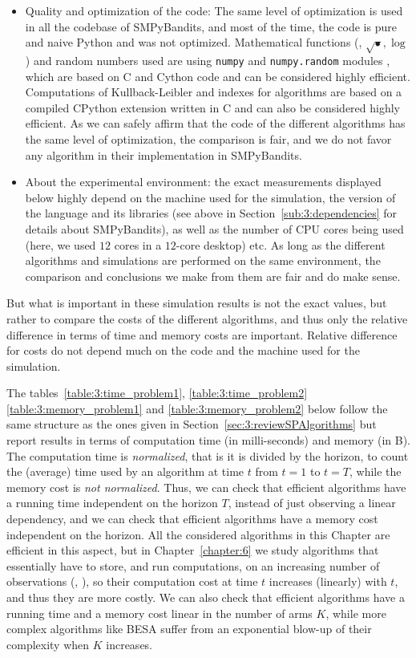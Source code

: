 \begin{itemize}
    \item Quality and optimization of the code:
    The same level of optimization is used in all the codebase of SMPyBandits, and most of the time, the code is pure and naive Python and was not optimized.
    Mathematical functions (\eg, $\sqrt{\bullet}, \log$) and random numbers used are using \texttt{numpy} and \texttt{numpy.random} modules \cite{numpy}, which are based on C and Cython code and can be considered highly efficient.
    Computations of Kullback-Leibler and indexes for \klUCB{} algorithms are based on a compiled CPython extension written in C and can also be considered highly efficient.
    As we can safely affirm that the code of the different algorithms has the same level of optimization, the comparison is fair, and we do not favor any algorithm in their implementation in SMPyBandits.

    \item About the experimental environment:
    the exact measurements displayed below highly depend on the machine used for the simulation, the version of the language and its libraries (see above in Section~\ref{sub:3:dependencies} for details about SMPyBandits), as well as the number of CPU cores being used (here, we used $12$ cores in a $12$-core desktop) etc.
    As long as the different algorithms and simulations are performed on the same environment, the comparison and conclusions we make from them are fair and do make sense.
\end{itemize}

But what is important in these simulation results is not the exact values, but rather to compare the costs of the different algorithms, and thus only the relative difference in terms of time and memory costs are important.
Relative difference for costs do not depend much on the code and the machine used for the simulation.

The tables~\ref{table:3:time_problem1}, \ref{table:3:time_problem2} \ref{table:3:memory_problem1} and \ref{table:3:memory_problem2} below follow the same structure as the ones given in Section~\ref{sec:3:reviewSPAlgorithms} but report results in terms of computation time (in milli-seconds) and memory (in B).
The computation time is \emph{normalized}, that is it is divided by the horizon, to count the (average) time used by an algorithm at time $t$ from $t=1$ to $t=T$, while the memory cost is \emph{not normalized}.
%
Thus, we can check that efficient algorithms have a running time independent on the horizon $T$, instead of just observing a linear dependency, and we can check that efficient algorithms have a memory cost independent on the horizon.
All the considered algorithms in this Chapter are efficient in this aspect, but in Chapter~\ref{chapter:6} we study algorithms that essentially have to store, and run computations, on an increasing number of observations (\eg, \CUSUMUCB), so their computation cost at time $t$ increases (linearly) with $t$, and thus they are more costly.
%
We can also check that efficient algorithms have a running time and a memory cost linear in the number of arms $K$, while more complex algorithms like BESA suffer from an exponential blow-up of their complexity when $K$ increases.


